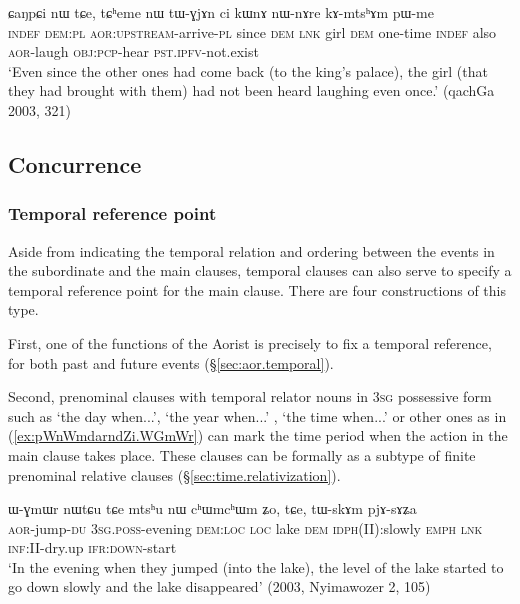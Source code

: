\begin{exe}
\ex \label{ex:lazGWtnW.CaNpCi} 
 ɕaŋpɕi nɯ tɕe, tɕʰeme nɯ tɯ-ɣjɤn ci kɯnɤ nɯ-nɤre kɤ-mtsʰɤm pɯ-me \\
\textsc{indef} \textsc{dem}:\textsc{pl} \textsc{aor}:\textsc{upstream}-arrive-\textsc{pl} since \textsc{dem} \textsc{lnk} girl \textsc{dem} one-time \textsc{indef} also \textsc{aor}-laugh \textsc{obj}:\textsc{pcp}-hear \textsc{pst}.\textsc{ipfv}-not.exist \\
\glt `Even since the other ones had come back (to the king's palace), the girl (that they had brought with them) had not been heard laughing even once.' (qachGa 2003, 321)
\end{exe}  

 
\subsection{Concurrence}

\subsubsection{Temporal reference point} \label{sec:temporal.reference}
Aside from indicating the temporal relation and ordering between the events in the subordinate and the main clauses, temporal clauses can also serve to specify a temporal reference point for the main clause. There are four constructions of this type.

First, one of the functions of the Aorist is precisely to fix a temporal reference, for both past and future events (§\ref{sec:aor.temporal}). 

Second, prenominal clauses with temporal relator nouns in \textsc{3sg} possessive form such as   `the day when...',  `the year when...' ,  `the time when...' or other ones as in (\ref{ex:pWnWmdarndZi.WGmWr}) can mark the time period when the action in the main clause takes place. These  clauses can be formally as a subtype of finite prenominal relative clauses (§\ref{sec:time.relativization}).
 
 \begin{exe}
\ex \label{ex:pWnWmdarndZi.WGmWr}
 ɯ-ɣmɯr nɯtɕu tɕe  mtsʰu nɯ cʰɯmcʰɯm ʑo, tɕe, tɯ-skɤm pjɤ-sɤʑa \\
\textsc{aor}-jump-\textsc{du} \textsc{3sg}.\textsc{poss}-evening \textsc{dem}:\textsc{loc} \textsc{loc} lake \textsc{dem} \textsc{idph}(II):slowly \textsc{emph} \textsc{lnk} \textsc{inf}:II-dry.up \textsc{ifr}:\textsc{down}-start \\
\glt `In the evening when they jumped (into the lake), the level of the lake started to go down slowly and the lake disappeared' (2003, Nyimawozer 2, 105)
\end{exe}

